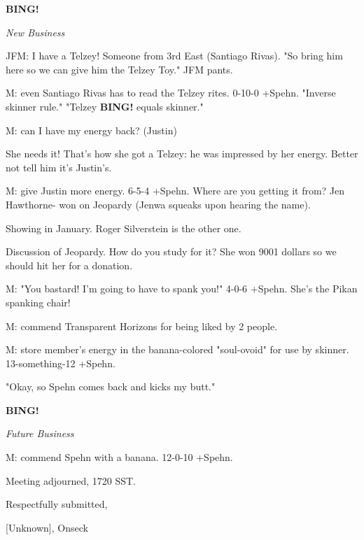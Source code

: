 \documentclass[12pt]{article}
\newcommand{\bing}{{\bf BING!} }
\newcommand{\goto}[1]{\bing \vskip 12pt \centerline{{\em{#1}}}}
\begin{document}
\goto{New Business}

JFM: I have a Telzey! Someone from 3rd East (Santiago Rivas). "So bring him here so we can give him the Telzey Toy." JFM pants.

M: even Santiago Rivas has to read the Telzey rites. 0-10-0 +Spehn. "Inverse skinner rule." "Telzey \bing equals skinner."

M: can I have my energy back? (Justin)

She needs it! That's how she got a Telzey: he was impressed by her energy. Better not tell him it's Justin's.

M: give Justin more energy. 6-5-4 +Spehn. Where are you getting it from? Jen Hawthorne- won on Jeopardy (Jenwa squeaks upon hearing the name).

Showing in January. Roger Silverstein is the other one.

Discussion of Jeopardy. How do you study for it? She won 9001 dollars so we should hit her for a donation.

M: "You bastard! I'm going to have to spank you!" 4-0-6 +Spehn. She's the Pikan spanking chair!

M: commend Transparent Horizons for being liked by 2 people.

M: store member's energy in the banana-colored "soul-ovoid" for use by skinner. 13-something-12 +Spehn.

"Okay, so Spehn comes back and kicks my butt."

\goto{Future Business}

M: commend Spehn with a banana. 12-0-10 +Spehn.

\vspace{12pt}

\noindent
Meeting adjourned, 1720 SST.

\vspace{18pt}

\centerline{Respectfully submitted,}
\centerline{[Unknown], Onseck}
\end{document}
